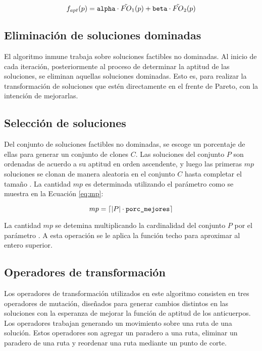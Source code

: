 \begin{equation}
\label{eq:fitness}
f_{apt}(p) = \alp \cdot \tilde{FO}_1(p) + \bet \cdot \tilde{FO}_2(p)
\end{equation}

\subsection{Eliminación de soluciones dominadas}

El algoritmo inmune trabaja sobre soluciones factibles no dominadas. Al inicio de cada iteración, posteriormente al proceso de determinar la aptitud de las soluciones, se eliminan aquellas soluciones dominadas. Esto es, para realizar la transformación de soluciones que estén directamente en el frente de Pareto, con la intención de mejorarlas.

\subsection{Selección de soluciones}

Del conjunto de soluciones factibles no dominadas, se escoge un porcentaje de ellas para generar un conjunto de clones $C$. Las soluciones del conjunto $P$ son ordenadas de acuerdo a su aptitud en orden ascendente, y luego las primeras $mp$ soluciones se clonan de manera aleatoria en el conjunto $C$ hasta completar el tamaño \clonsize. La cantidad $mp$ es determinada utilizando el parámetro \pmejores{} como se muestra en la Ecuación \eqref{eq:mp}:

\begin{equation}
\label{eq:mp}
mp = \ceil*{|P| \cdot \pmejores}
\end{equation}

La cantidad $mp$ se detemina multiplicando la cardinalidad del conjunto $P$ por el parámetro \pmejores. A esta operación se le aplica la función techo para aproximar al entero superior.

\subsection{Operadores de transformación}

Los operadores de transformación utilizados en este algoritmo consisten en tres operadores de mutación, diseñados para generar cambios distintos en las soluciones con la esperanza de mejorar la función de aptitud de los anticuerpos. Los operadores trabajan generando un movimiento sobre una ruta de una solución. Estos operadores son agregar un paradero a una ruta, eliminar un paradero de una ruta y reordenar una ruta mediante un punto de corte.

